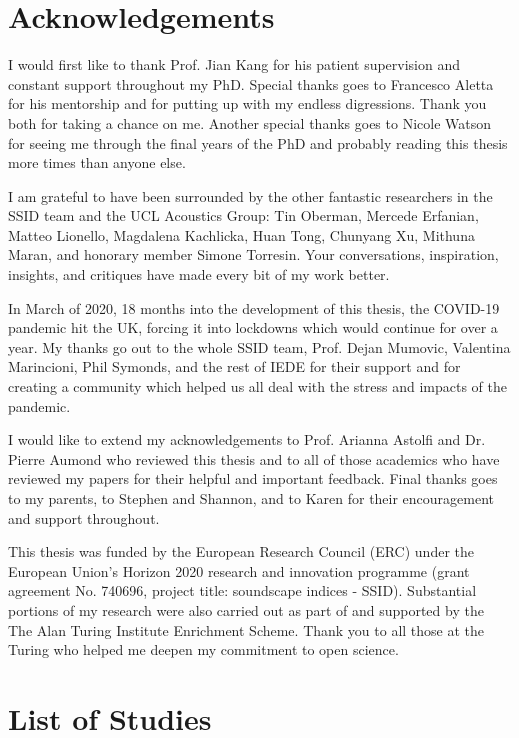 \documentclass[twoside,fontsize=11pt,titlepage,chapterprefix=true
]{scrbook}
\begin{document}

\chapter*{Acknowledgements}

I would first like to thank Prof. Jian Kang for his patient supervision and constant support throughout my PhD. Special thanks goes to Francesco Aletta for his mentorship and for putting up with my endless digressions. Thank you both for taking a chance on me. Another special thanks goes to Nicole Watson for seeing me through the final years of the PhD and probably reading this thesis more times than anyone else. 

I am grateful to have been surrounded by the other fantastic researchers in the SSID team and the UCL Acoustics Group: Tin Oberman, Mercede Erfanian, Matteo Lionello, Magdalena Kachlicka, Huan Tong, Chunyang Xu, Mithuna Maran, and honorary member Simone Torresin. Your conversations, inspiration, insights, and critiques have made every bit of my work better. 

In March of 2020, 18 months into the development of this thesis, the COVID-19 pandemic hit the UK, forcing it into lockdowns which would continue for over a year. My thanks go out to the whole SSID team, Prof. Dejan Mumovic, Valentina Marincioni, Phil Symonds, and the rest of IEDE for their support and for creating a community which helped us all deal with the stress and impacts of the pandemic. 

I would like to extend my acknowledgements to Prof. Arianna Astolfi and Dr. Pierre Aumond who reviewed this thesis and to all of those academics who have reviewed my papers for their helpful and important feedback. Final thanks goes to my parents, to Stephen and Shannon, and to Karen for their encouragement and support throughout.

This thesis was funded by the European Research Council (ERC) under the European Union’s Horizon 2020 research and innovation programme (grant agreement No. 740696, project title: soundscape indices - SSID). Substantial portions of my research were also carried out as part of and supported by the The Alan Turing Institute Enrichment Scheme. Thank you to all those at the Turing who helped me deepen my commitment to open science.

\chapter*{List of Studies}
\end{document}
